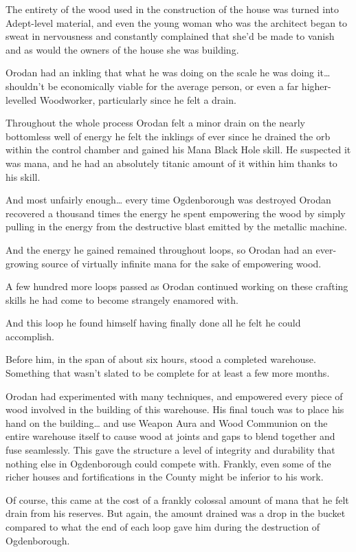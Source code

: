 \documentclass[a4paper,10pt]{book}
\begin{document}
The entirety of the wood used in the construction of the house was turned into Adept-level material, and even the young woman who was the architect began to sweat in nervousness and constantly complained that she’d be made to vanish and as would the owners of the house she was building.\par
Orodan had an inkling that what he was doing on the scale he was doing it… shouldn’t be economically viable for the average person, or even a far higher-levelled Woodworker, particularly since he felt a drain.\par
Throughout the whole process Orodan felt a minor drain on the nearly bottomless well of energy he felt the inklings of ever since he drained the orb within the control chamber and gained his Mana Black Hole skill. He suspected it was mana, and he had an absolutely titanic amount of it within him thanks to his skill.\par
And most unfairly enough… every time Ogdenborough was destroyed Orodan recovered a thousand times the energy he spent empowering the wood by simply pulling in the energy from the destructive blast emitted by the metallic machine.\par
And the energy he gained remained throughout loops, so Orodan had an ever-growing source of virtually infinite mana for the sake of empowering wood.\par
\par
A few hundred more loops passed as Orodan continued working on these crafting skills he had come to become strangely enamored with.\par
And this loop he found himself having finally done all he felt he could accomplish.\par
Before him, in the span of about six hours, stood a completed warehouse. Something that wasn’t slated to be complete for at least a few more months.\par
Orodan had experimented with many techniques, and empowered every piece of wood involved in the building of this warehouse. His final touch was to place his hand on the building… and use Weapon Aura and Wood Communion on the entire warehouse itself to cause wood at joints and gaps to blend together and fuse seamlessly. This gave the structure a level of integrity and durability that nothing else in Ogdenborough could compete with. Frankly, even some of the richer houses and fortifications in the County might be inferior to his work.\par
Of course, this came at the cost of a frankly colossal amount of mana that he felt drain from his reserves. But again, the amount drained was a drop in the bucket compared to what the end of each loop gave him during the destruction of Ogdenborough.\par
\end{document}
